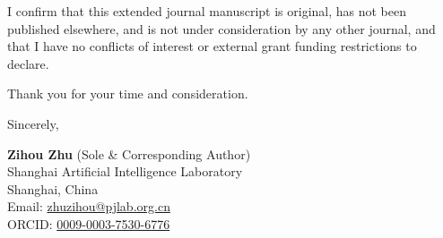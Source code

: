 \documentclass[11pt,a4paper]{article}
\begin{document}
I confirm that this extended journal manuscript is original, has not been published elsewhere, and is not under consideration by any other journal, and that I have no conflicts of interest or external grant funding restrictions to declare.

Thank you for your time and consideration.

Sincerely,

\vspace{0.8em}
\textbf{Zihou Zhu} (Sole \& Corresponding Author)\\
Shanghai Artificial Intelligence Laboratory\\
Shanghai, China\\
Email: \href{mailto:zhuzihou@pjlab.org.cn}{zhuzihou@pjlab.org.cn}\\
ORCID: \href{https://orcid.org/0009-0003-7530-6776}{0009-0003-7530-6776}
\end{document}
